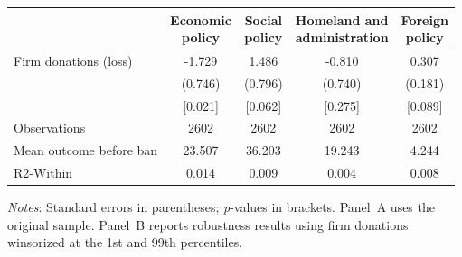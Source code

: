 \documentclass[12pt,a4paper]{article}
\begin{document}
\begin{table}[!htbp]
{
\def\sym#1{\ifmmode^{#1}\else\(^{#1}\)\fi}
\begin{tabular}{lcccc}
\hline\hline
                & \shortstack{Economic\\policy}
                & \shortstack{Social\\policy}
                & \shortstack{Homeland and\\administration}
                & \shortstack{Foreign\\policy} \\
\hline
Firm donations (loss)
                &   -1.729        &    1.486        &   -0.810        &    0.307        \\
                &   (0.746)       &   (0.796)       &   (0.740)       &   (0.181)       \\
                &   [0.021]       &   [0.062]       &   [0.275]       &   [0.089]       \\
Observations    &    2602         &    2602         &    2602         &    2602         \\
Mean outcome before ban
                &   23.507        &   36.203        &   19.243        &    4.244        \\
R2-Within       &    0.014        &    0.009        &    0.004        &    0.008        \\
\hline\hline
\end{tabular}
}

\vspace{1mm}
\begin{flushleft}
\footnotesize
\justifying
\textit{Notes}: Standard errors in parentheses; \textit{p}-values in brackets.  
Panel~A uses the original sample.  
Panel~B reports robustness results using firm donations winsorized at the 1st and 99th percentiles.
\end{flushleft}

\end{table}
\end{document}
